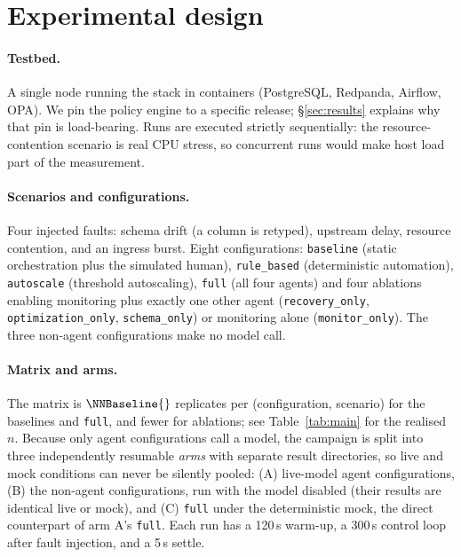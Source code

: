 \section{Experimental design}\label{sec:method}

\paragraph{Testbed.}
A single node running the stack in containers (PostgreSQL, Redpanda, Airflow, OPA). We pin the policy
engine to a specific release; \S\ref{sec:results} explains why that pin is load-bearing. Runs are
executed strictly sequentially: the resource-contention scenario is real CPU stress, so concurrent
runs would make host load part of the measurement.

\paragraph{Scenarios and configurations.}
Four injected faults: schema drift (a column is retyped), upstream delay, resource contention, and an
ingress burst. Eight configurations: \texttt{baseline} (static orchestration plus the simulated
human), \texttt{rule\_based} (deterministic automation), \texttt{autoscale} (threshold autoscaling),
\texttt{full} (all four agents) and four ablations enabling monitoring plus exactly one other agent
(\texttt{recovery\_only}, \texttt{optimization\_only}, \texttt{schema\_only}) or monitoring alone
(\texttt{monitor\_only}). The three non-agent configurations make no model call.

\paragraph{Matrix and arms.}
The matrix is $\NNBaseline{}$ replicates per (configuration, scenario) for the baselines and
\texttt{full}, and fewer for ablations; see Table~\ref{tab:main} for the realised $n$. Because only
agent configurations call a model, the campaign is split into three independently resumable
\emph{arms} with separate result directories, so live and mock conditions can never be silently
pooled: (A) live-model agent configurations, (B) the non-agent configurations, run with the model
disabled (their results are identical live or mock), and (C) \texttt{full} under the deterministic
mock, the direct counterpart of arm A's \texttt{full}. Each run has a 120\,s warm-up, a 300\,s control
loop after fault injection, and a 5\,s settle.

